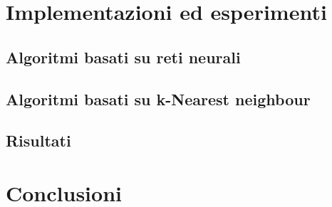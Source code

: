 \documentclass[11pt]{article}
\begin{document}
	\section{Implementazioni ed esperimenti}
	\subsection{Algoritmi basati su reti neurali}
	\subsection{Algoritmi basati su k-Nearest neighbour}



% 

	\subsection{Risultati}
	\section{Conclusioni}




\end{document}
